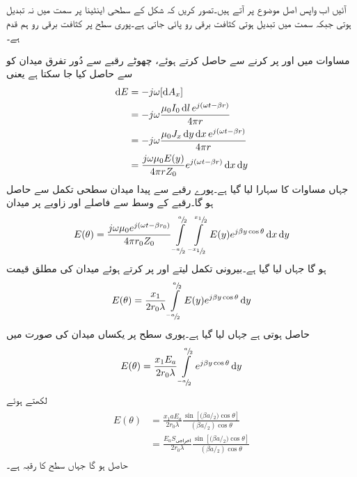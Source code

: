 آئیں اب واپس اصل موضوع پر آتے ہیں۔تصور کریں کہ شکل  کے سطحی اینٹینا پر  سمت میں نہ تبدیل ہوتی جبکہ  سمت میں تبدیل ہوتی کثافت برقی رو  پائی جاتی ہے۔پوری سطح پر کثافت برقی رو ہم قدم ہے۔

مساوات  میں  اور  پر کرنے  سے  حاصل کرتے ہوئے، چھوٹے رقبے   سے دُور تفرق میدان کو  سے حاصل کیا جا سکتا ہے یعنی
\begin{gather}
\begin{aligned}
\dif E &=-j \omega [\dif A_x] \\
&=-j \omega \frac{\mu_0 I_0 \dif l \, e^{j(\omega t -\beta r)}}{4\pi r}  \\
&=-j \omega \frac{\mu_0 J_x \dif y \dif x \, e^{j(\omega t -\beta r)}}{4\pi r}  \\
&=\frac{j \omega \mu_0 E(y)}{4\pi r Z_0} e^{j(\omega t-\beta r)} \dif x \dif y
\end{aligned}
\end{gather}
جہاں مساوات  کا سہارا لیا گیا ہے۔پورے رقبے  سے پیدا میدان سطحی تکمل سے حاصل ہو گا۔رقبے کے وسط سے  فاصلے اور  زاویے پر میدان
\begin{align}
E(\theta)=\frac{j \omega \mu_0 e^{j(\omega t-\beta r_0)}}{4\pi r_0 Z_0} \int \limits_{^{-a}\!/\!_2}^{^a\!/\!_2} \int \limits_{^{-x_1}\!/\!_2}^{^{x_1}\!/\!_2} E(y) e^{j\beta y \cos \theta} \dif x \dif y
\end{align}
ہو گا جہاں  لیا گیا ہے۔بیرونی تکمل لیتے اور  پر کرتے ہوئے  میدان کی مطلق قیمت  
\begin{align}\label{مساوات_اینٹینا_فوریئر_تعلق_الف}
E(\theta)=\frac{x_1}{2 r_0 \lambda} \int \limits_{^{-a}\!/\!_2}^{^a\!/\!_2}  E(y) e^{j\beta y \cos \theta} \dif y
\end{align}
حاصل ہوتی ہے جہاں  لیا گیا ہے۔پوری سطح پر یکساں میدان  کی صورت میں
\begin{align}
E(\theta)=\frac{x_1 E_a}{2 r_0 \lambda} \int \limits_{^{-a}\!/\!_2}^{^a\!/\!_2}  e^{j\beta y \cos \theta} \dif y
\end{align}
لکھتے ہوئے
\begin{gather}
\begin{aligned}\label{مساوات_اینٹینا_سطحی_دور_میدان}
E(\theta)&=\frac{x_1 a E_a }{2 r_0 \lambda} \frac{\sin [{(\beta a}\!/\!_2)\cos \theta ]}{({\beta a}\!/\!_2)\cos \theta}\\
&=\frac{E_a S_{\text{اخراجی}}}{2 r_0 \lambda} \frac{\sin [{(\beta a}\!/\!_2)\cos \theta ]}{({\beta a}\!/\!_2)\cos \theta}
\end{aligned}
\end{gather}
حاصل ہو گا جہاں  سطح کا رقبہ ہے۔

